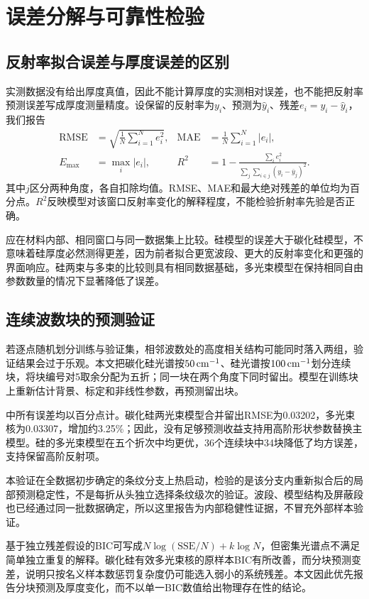 \section{误差分解与可靠性检验}
\label{sec:validation}
\subsection{反射率拟合误差与厚度误差的区别}
实测数据没有给出厚度真值，因此不能计算厚度的实测相对误差，也不能把反射率预测误差写成厚度测量精度。设保留的反射率为$y_i$、预测为$\widehat y_i$、残差$e_i=y_i-\widehat y_i$，我们报告
\begin{align}
 \mathrm{RMSE}&=\sqrt{\frac{1}{N}\sum_{i=1}^N e_i^2}, &
 \mathrm{MAE}&=\frac{1}{N}\sum_{i=1}^N |e_i|,\\
 E_{\max}&=\max_i |e_i|, &
 R^2&=1-\frac{\sum_i e_i^2}{\sum_j\sum_{i\in j}(y_i-\overline y_j)^2}.
 \label{eq:validation-metrics}
\end{align}
其中$j$区分两种角度，各自扣除均值。RMSE、MAE和最大绝对残差的单位均为百分点。$R^2$反映模型对该窗口反射率变化的解释程度，不能检验折射率先验是否正确。


应在材料内部、相同窗口与同一数据集上比较。硅模型的误差大于碳化硅模型，不意味着硅厚度必然测得更差，因为前者拟合更宽波段、更大的反射率变化和更强的界面响应。硅两束与多束的比较则具有相同数据基础，多光束模型在保持相同自由参数数量的情况下显著降低了误差。

\subsection{连续波数块的预测验证}
若逐点随机划分训练与验证集，相邻波数处的高度相关结构可能同时落入两组，验证结果会过于乐观。本文把碳化硅光谱按$50\,\mathrm{cm}^{-1}$、硅光谱按$100\,\mathrm{cm}^{-1}$划分连续块，将块编号对5取余分配为五折；同一块在两个角度下同时留出。模型在训练块上重新估计背景、标定和非线性参数，再预测留出块。


中所有误差均以百分点计。碳化硅两光束模型合并留出RMSE为0.03202，多光束核为0.03307，增加约3.25\%；因此，没有足够预测收益支持用高阶形状参数替换主模型。硅的多光束模型在五个折次中均更优，36个连续块中34块降低了均方误差，支持保留高阶反射项。

本验证在全数据初步确定的条纹分支上热启动，检验的是该分支内重新拟合后的局部预测稳定性，不是每折从头独立选择条纹级次的验证。波段、模型结构及屏蔽段也已经通过同一批数据确定，所以这里报告为内部稳健性证据，不冒充外部样本验证。

基于独立残差假设的BIC可写成$N\log(\mathrm{SSE}/N)+k\log N$\cite{Schwarz1978}，但密集光谱点不满足简单独立重复的解释。碳化硅有效多光束核的原样本BIC有所改善，而分块预测变差，说明只按名义样本数惩罚复杂度仍可能选入弱小的系统残差。本文因此优先报告分块预测及厚度变化，而不以单一BIC数值给出物理存在性的结论。

